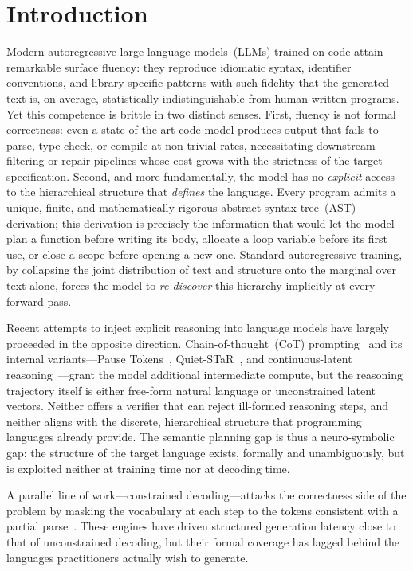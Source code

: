 \documentclass[11pt]{article}
\theoremstyle{plain}
\theoremstyle{definition}
\begin{document}
\section{Introduction}

Modern autoregressive large language models~(LLMs) trained on code attain
remarkable surface fluency: they reproduce idiomatic syntax, identifier
conventions, and library-specific patterns with such fidelity that the generated
text is, on average, statistically indistinguishable from human-written
programs. Yet this competence is brittle in two distinct senses. First, fluency
is not formal correctness: even a state-of-the-art code model produces output
that fails to parse, type-check, or compile at non-trivial rates, necessitating
downstream filtering or repair pipelines whose cost grows with the strictness of
the target specification. Second, and more fundamentally, the model has no
\emph{explicit} access to the hierarchical structure that \emph{defines} the
language. Every program admits a unique, finite, and mathematically rigorous
abstract syntax tree~(AST) derivation; this derivation is precisely the
information that would let the model plan a function before writing its body,
allocate a loop variable before its first use, or close a scope before opening a
new one. Standard autoregressive training, by collapsing the joint distribution
of text and structure onto the marginal over text alone, forces the model to
\emph{re-discover} this hierarchy implicitly at every forward pass.

Recent attempts to inject explicit reasoning into language models have largely
proceeded in the opposite direction. Chain-of-thought~(CoT)
prompting~\cite{chain-of-thought} and its internal variants---Pause
Tokens~\cite{think-before}, Quiet-STaR~\cite{quiet-star}, and continuous-latent
reasoning~\cite{coconut-2025}---grant the model additional intermediate compute,
but the reasoning trajectory itself is either free-form natural language or
unconstrained latent vectors. Neither offers a verifier that can reject
ill-formed reasoning steps, and neither aligns with the discrete, hierarchical
structure that programming languages already provide. The semantic planning gap
is thus a neuro-symbolic gap: the structure of the target language exists,
formally and unambiguously, but is exploited neither at training time nor at
decoding time.

A parallel line of work---constrained decoding---attacks the correctness side of
the problem by masking the vocabulary at each step to the tokens consistent with
a partial parse~\cite{picard, outlines, syncode, xgrammar, xgrammar-2,
llguidance, guidance}. These engines have driven structured generation latency
close to that of unconstrained decoding, but their formal coverage has lagged
behind the languages practitioners actually wish to generate.
\end{document}
